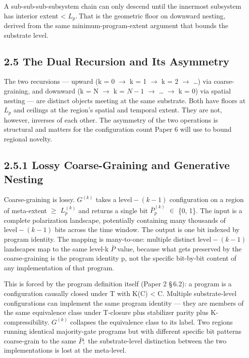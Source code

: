 \documentclass[11pt,oneside]{report}
\theoremstyle{definition}
\theoremstyle{remark}
\begin{document}
A sub-sub-sub-subsystem chain can only descend until the innermost
subsystem has interior extent \textless{} \ensuremath{L_{p}.~\text{That}} is the geometric
floor on downward nesting, derived from the same minimum-program-extent
argument that bounds the substrate level.

\subsection*{2.5 The Dual Recursion and Its Asymmetry}

The two recursions --- upward (k = 0 \ensuremath{\to} k = 1 \ensuremath{\to} k = 2 \ensuremath{\to} \ldots) via
coarse-graining, and downward (k = N \ensuremath{\to} k = \ensuremath{N-1} \ensuremath{\to} \ldots{} \ensuremath{\to} k = 0) via
spatial nesting --- are distinct objects meeting at the same substrate.
Both have floors at \ensuremath{L_{p}} and ceilings at the region's spatial and
temporal extent. They are not, however, inverses of each other. The
asymmetry of the two operations is structural and matters for the
configuration count Paper 6 will use to bound regional novelty.

\subsection*{2.5.1 Lossy Coarse-Graining and Generative Nesting}

Coarse-graining is lossy. \ensuremath{G^{(k)}} takes a \ensuremath{\text{level}-(k-1)} configuration on
a region of meta-extent \ensuremath{\geq} \ensuremath{L_{p}^{(k)}} and returns a single bit
\ensuremath{\bar{P}^{(k)}_{p}} \ensuremath{\in} \{0, 1\}. The input is a complete polarization landscape,
potentially containing many thousands of \ensuremath{\text{level}-(k-1)} bits across the
time window. The output is one bit indexed by program identity. The
mapping is many-to-one: multiple distinct \ensuremath{\text{level}-(k-1)} landscapes map to
the same level-k \ensuremath{\bar{P}} value, because what gets preserved by the
coarse-graining is the program identity p, not the specific bit-by-bit
content of any implementation of that program.

This is forced by the program definition itself (Paper 2 \S\,6.2): a
program is a configuration causally closed under T with K(C) \textless{}
\textbar C\textbar. Multiple substrate-level configurations can
implement the same program identity --- they are members of the same
equivalence class under T-closure plus stabilizer parity plus
K-compressibility. \ensuremath{G^{(k)}} collapses the equivalence class to its
label. Two regions running identical majority-gate programs but with
different specific bit patterns coarse-grain to the same \ensuremath{\bar{P};} the
substrate-level distinction between the two implementations is lost at
the meta-level.
\end{document}
